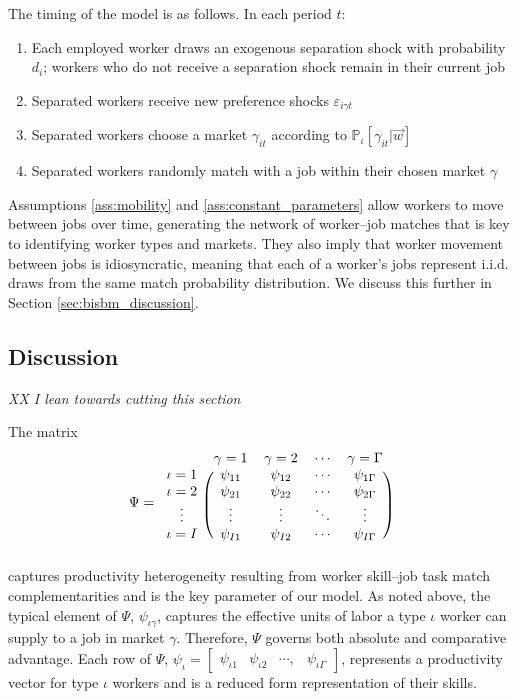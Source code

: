 \documentclass[12pt]{article}
\def\ig{\iota\gamma}
\def\g{\gamma}
\def\i{\iota}
\renewcommand{\P}{\mathbb {P}}
\theoremstyle{definition}
\theoremstyle{plain}
\def\ve{\varepsilon}
\begin{document}
The timing of the model is as follows. In each period $t$:
\begin{enumerate}
	\item Each employed worker draws an exogenous separation shock with probability $d_i$; workers who do not receive a separation shock remain in their current job
	\item Separated workers receive new preference shocks $\ve_{i\g t}$
	\item Separated workers choose a market $\g_{it}$ according to $\P_{\i}[\g_{it} |  \vec{w}]$
	\item Separated workers randomly match with a job within their chosen market $\g$
\end{enumerate}

Assumptions \ref{ass:mobility} and \ref{ass:constant_parameters} allow workers to move between jobs over time, generating the network of worker--job matches that is key to identifying worker types and markets. They also imply that worker movement between jobs is idiosyncratic, meaning that each of a worker's jobs represent i.i.d. draws from the same match probability distribution. We discuss this further in Section \ref{sec:bisbm_discussion}.



\subsection{Discussion}


\label{sec:model_discussion}

\emph{ XX I lean towards cutting this section}

The matrix 
\begin{align}
\Psi =
\begin{blockarray}{ccccc}
& \gamma=1	& \gamma=2 	& \cdots	& \gamma=\Gamma 	\\
\begin{block}{c(cccc)}
\iota=1 	& \psi_{11} & \psi_{12} & \cdots 	& \psi_{1\Gamma} 	\\
\iota=2 	& \psi_{21} & \psi_{22}	& \cdots 	& \psi_{2\Gamma}	\\
\vdots 		& \vdots 	& \vdots 	& \ddots 	& \vdots			\\
\iota=I 	& \psi_{I1} & \psi_{I2} & \cdots 	& \psi_{I\Gamma}	\\
\end{block}
\end{blockarray} \label{eq:Psi}
\end{align}
captures productivity heterogeneity resulting from worker skill--job task match complementarities and is the key parameter of our model. As noted above, the typical element of $\Psi$, $\psi_{\ig}$, captures the effective units of labor a type $\i$ worker can supply to a job in market $\g$. Therefore, $\Psi$ governs both absolute and comparative advantage. Each row of $\Psi$, $\psi_\i = \begin{bmatrix}	\psi_{\i 1} & \psi_{\i 2} & \cdots , &  \psi_{\i \Gamma}	\end{bmatrix}$, represents a productivity vector for type $\i$ workers and is a reduced form representation of their skills. 
\end{document}
